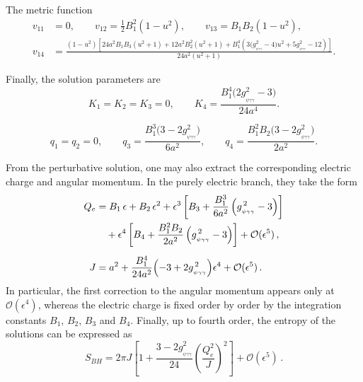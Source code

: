 \documentclass[11pt]{article}
\numberwithin{equation}{section} %
\begin{document}
The metric function
%
\begin{equation}
\begin{aligned}
v_{11} &= 0,\qquad
v_{12} = \tfrac{1}{2} B_{1}^{2}(1-u^{2}),\qquad
v_{13} = B_{1} B_{2}(1-u^{2}),\\
v_{14} &= \frac{(1-u^{2})\!\left[
24 a^{2} B_{1} B_{3}(u^{2}+1) + 12 a^{2} B_{2}^{2}(u^{2}+1)
+ B_{1}^{4}\!\left(3\bigl(g_{_{\psi\gamma\gamma}}^{2}-4\bigr) u^{2} + 5 g_{_{\psi\gamma\gamma}}^{2}-12\right)
\right]}{24 a^{2}(u^{2}+1)}.
\end{aligned}
\end{equation}

Finally, the solution parameters are
\begin{equation}
K_{1}=K_{2}=K_{3}=0,\qquad
K_{4}=\frac{B_{1}^{4}\bigl(2 g_{_{\psi\gamma\gamma}}^{2}-3\bigr)}{24 a^{4}}.
\end{equation}

\begin{equation}
q_{1}=q_{2}=0,\qquad
q_{3}=\frac{B_{1}^{3}\bigl(3-2 g_{_{\psi\gamma\gamma}}^{2}\bigr)}{6 a^{2}},\qquad
q_{4}=\frac{B_{1}^{2} B_{2}\bigl(3-2 g_{_{\psi\gamma\gamma}}^{2}\bigr)}{2 a^{2}}.
\end{equation}



 {From the perturbative solution, one may also extract the corresponding electric charge and
angular momentum. In the purely electric branch, they take the form}
\begin{align}
Q_e &= B_1 \,\epsilon + B_2 \,\epsilon^2 + \epsilon^3 \left[
B_3 + \frac{B_1^3}{6 a^2}\left(g_{_{\psi\gamma\gamma}}^{\,2}-3\right)
\right]
\nonumber\\
&\quad + \epsilon^4 \left[
B_4 + \frac{B_1^2 B_2}{2 a^2}\left(g_{_{\psi\gamma\gamma}}^{\,2}-3\right)
\right]
+ \mathcal{O}(\epsilon^5) \, ,
\\[0.5em]
J &= a^2 + \frac{B_1^4}{24 a^2}\Bigl(-3 + 2 g_{_{\psi\gamma\gamma}}^{\,2}\Bigr)\epsilon^4
+ \mathcal{O}(\epsilon^5) \, .
\end{align}
In particular, the first correction to the angular momentum appears only at
$\mathcal{O}(\epsilon^4)$, whereas the electric charge is fixed order by order by the
integration constants $B_1$, $B_2$, $B_3$ and $B_4$. Finally, up to fourth order, the entropy
of the solutions can be expressed as
%
\begin{equation}
    S_{BH}=2\pi J\left[1+\dfrac{3-2 g_{_{\psi\gamma\gamma}}^2}{24}\left(\dfrac{Q_e^2}{J}\right)^2\right]+\mathcal{O}(\epsilon^5)\,.
\end{equation}
\end{document}

